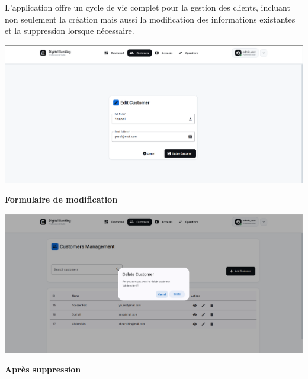 \documentclass[10pt]{article}
\begin{document}
\begin{minipage}{\textwidth}
    \begin{minipage}{0.58\textwidth}
        \begin{secondarybox}[title=Cycle de vie complet des clients]
            L'application offre un cycle de vie complet pour la gestion des clients, 
            incluant non seulement la création mais aussi la modification des informations 
            existantes et la suppression lorsque nécessaire.
            
            \vspace{0.3cm}
        \end{secondarybox}
    \end{minipage}
    \hfill
    \begin{minipage}{0.38\textwidth}
        \begin{imagebox}
            \includegraphics[width=\textwidth]{screenshots/04_05_customer_form_edit_prefilled.png}
            \caption*{\textbf{\sffamily\small Formulaire de modification}}
        \end{imagebox}
        
        \vspace{0.5cm}
        
        \begin{imagebox}
            \includegraphics[width=\textwidth]{screenshots/04_08_customer_list_after_delete.png}
            \caption*{\textbf{\sffamily\small Après suppression}}
        \end{imagebox}
    \end{minipage}
\end{minipage}
\end{document}

